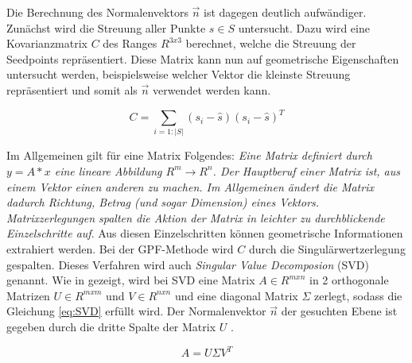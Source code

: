 Die Berechnung des Normalenvektors $\vec{n}$ ist dagegen deutlich aufwändiger. Zunächst wird die Streuung aller Punkte $s \in S$ untersucht. Dazu wird eine Kovarianzmatrix $C$ des Ranges $R^{3x3}$ berechnet, welche die Streuung der Seedpoints repräsentiert. Diese Matrix kann nun auf geometrische Eigenschaften untersucht werden, beispielsweise welcher Vektor die kleinste Streuung repräsentiert und somit als $\vec{n}$ verwendet werden kann.

\begin{equation} 
C=\sum_{i=1:\vert S\vert }(s_{i}-\hat{s})(s_{i}-\hat{s})^{T}
\label{eq:Covar} 
\end{equation}

Im Allgemeinen gilt für eine Matrix Folgendes: \glqq \textit{Eine Matrix definiert durch $y=A*x$ eine lineare Abbildung $R^m \to R^n$. Der Hauptberuf einer Matrix ist, aus einem Vektor einen anderen zu machen. Im Allgemeinen ändert die Matrix dadurch Richtung, Betrag (und sogar
Dimension) eines Vektors. Matrixzerlegungen spalten die Aktion der Matrix in leichter zu durchblickende Einzelschritte auf}\grqq \cite{bib:Decomposion}. Aus diesen Einzelschritten können geometrische Informationen extrahiert werden. Bei der GPF-Methode wird $C$ durch die Singulärwertzerlegung gespalten. Dieses Verfahren wird auch \textit{Singular Value Decomposion} (SVD) genannt. Wie in \cite{bib:SVD} gezeigt, wird bei SVD eine Matrix $A \in R^{mxn}$ in 2 orthogonale Matrizen $U \in R^{mxm}$ und $V\in R^{nxn}$ und eine diagonal Matrix $\Sigma$ zerlegt, sodass die Gleichung \ref{eq:SVD} erfüllt wird. Der Normalenvektor $\vec{n}$ der gesuchten Ebene ist gegeben durch die dritte Spalte der Matrix $U$ \cite{bib:SVDforFitting}.

\begin{equation} 
A=U \Sigma V^T
\label{eq:SVD}
\end{equation}


